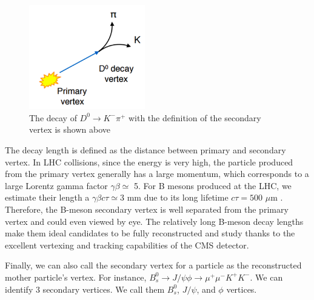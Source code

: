 \begin{figure}[hbtp]
\begin{center}
\includegraphics[width=0.45\textwidth]{Figures/Chapter4/D0Seconary.png}
\caption{The decay of $D^0 \rightarrow K^- \pi^+$ with the definition of the secondary vertex is shown above}
\label{D0Vtx}
\end{center}
\end{figure} 

The decay length is defined as the distance between primary and secondary vertex. In LHC collisions, since the energy is very high, the particle produced from the primary vertex generally has a large momentum, which corresponds to a large Lorentz gamma factor $\gamma \beta \simeq$ 5. For B mesons produced at the LHC, we estimate their length a $\gamma \beta c \tau \simeq 3$ mm due to its long lifetime $c \tau = 500$ $\mu$m \cite{AlphaTheoEx}. Therefore, the B-meson secondary vertex is well separated from the primary vertex and could even viewed by eye. The relatively long B-meson decay lengths make them ideal candidates to be fully reconstructed and study thanks to the excellent vertexing and tracking capabilities of the CMS detector.

Finally, we can also call the secondary vertex for a particle as the reconstructed mother particle's vertex. For instance, $B^0_s \rightarrow J/\psi \phi \rightarrow \mu^+\mu^- K^+K^-$. We can identify 3 secondary vertices. We call them $B^0_s$, $J/\psi$, and $\phi$ vertices. 


